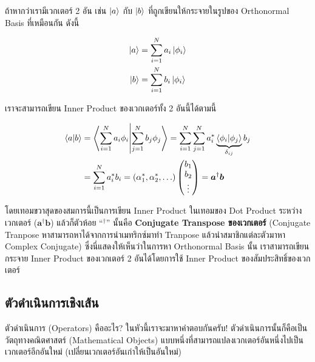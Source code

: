 ถ้าหากว่าเรามีเวกเตอร์ 2 อัน เช่น $\ket{a}$ กับ $\ket{b}$ ที่ถูกเขียนให้กระจายในรูปของ Orthonormal Basis ที่เหมือนกัน ดังนี้

\begin{equation}
  \begin{split}
    \ket{a} &= \sum_{i = 1}^N a_i \ket{\phi_i} \\
    \ket{b} &= \sum_{i = 1}^N b_i \ket{\phi_i}
  \end{split}
\end{equation}

\noindent เราจะสามารถเขียน Inner Product ของเวกเตอร์ทั้ง 2 อันนี้ได้ตามนี้

\begin{equation}
  \begin{split}
    \braket{a}{b} &= \braket{\sum_{i = 1}^N a_i \phi_i}{\sum_{j = 1}^N b_j \phi_j }
    = \sum_{i = 1}^N  \sum_{j = 1}^N a_i^*  \underbrace{\braket{\phi_i}{\phi_j}}_{\delta_{ij}} b_j \\
    &= \sum_{i = 1}^N a_i^* b_i = (\alpha^*_1, \alpha^*_2,\ldots)
    \begin{pmatrix}
      b_1 \\
      b_2 \\
      \vdots
    \end{pmatrix} =
    \bm{a}^\dagger\bm{b}
  \end{split}
\end{equation}

\noindent โดยเทอมขวาสุดของสมการนี้เป็นการเขียน Inner Product ในเทอมของ Dot Product ระหว่างเวกเตอร์ ($\bm{a}^\dagger
  \bm{b}$) แล้วก็ตัวห้อย ``${}^\dagger$'' นั้นคือ \textbf{Conjugate Transpose ของเวกเตอร์} (Conjugate Tranpose
หาสามารถหาได้จากการนำเมทริกซ์มาทำ Tranpose แล้วนำสมาชิกแต่ละตัวมาหา Complex Conjugate) ซึ่งนี่แสดงให้เห็นว่าในการหา Orthonormal
Basis นั้น เราสามารถเขียนกระจาย Inner Product ของเวกเตอร์ 2 อันได้โดยการใช้ Inner Product ของสัมประสิทธิ์ของเวกเตอร์

\subsection{ตัวดำเนินการเชิงเส้น}

ตัวดำเนินการ (Operators) คืออะไร? ในหัวนี้เราจะมาหาคำตอบกันครับ! ตัวดำเนินการนั้นก็คือเป็นวัตถุทางคณิตศาสตร์ (Mathematical Objects)
แบบหนึ่งที่สามารถแปลงเวกเตอร์อันหนึ่งไปเป็นเวกเตอร์อีกอันใหม่ (เปลี่ยนเวกเตอร์อันเก่าให้เป็นอันใหม่)

